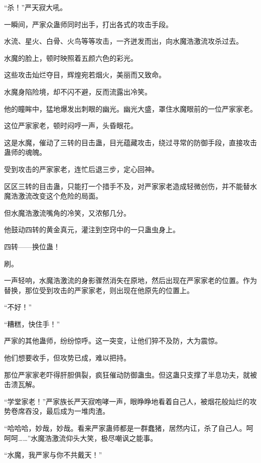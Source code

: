 
\begin{this_body}



“杀！”严天寂大吼。

一瞬间，严家众蛊师同时出手，打出各式的攻击手段。

水流、星火、白骨、火鸟等等攻击，一齐迸发而出，向水魔浩激流攻杀过去。

水魔的脸上，顿时映照着五颜六色的彩光。

这些攻击灿烂夺目，辉煌宛若烟火，美丽而又致命。

水魔身陷险境，却不闪不避，反而流露出冷笑。

他的瞳眸中，猛地爆发出刺眼的幽光。幽光大盛，罩住水魔眼前的一位严家家老。

这位严家家老，顿时闷哼一声，头昏眼花。

这是水魔，催动了三转的目击蛊，目光蕴藏攻击，绕过寻常的防御手段，直接攻击蛊师的魂魄。

受到攻击的严家家老，连忙后退三步，定心回神。

区区三转的目击蛊，只能打一个措手不及，对严家家老造成轻微创伤，并不能替水魔浩激流改变这个危险的局面。

但水魔浩激流嘴角的冷笑，又浓郁几分。

他鼓动四转的黄金真元，灌注到空窍中的一只蛊虫身上。

四转——换位蛊！

刷。

一声轻响，水魔浩激流的身影骤然消失在原地，然后出现在严家家老的位置。作为替换，那位受到攻击的严家家老，则出现在他原先的位置上。

“不好！”

“糟糕，快住手！”

严家的其他蛊师，纷纷惊呼。这一突变，让他们猝不及防，大为震惊。

他们想要收手，但攻势已成，难以把持。

那位严家家老吓得肝胆俱裂，疯狂催动防御蛊虫。但这蛊只支撑了半息功夫，就被击溃瓦解。

“学堂家老！”严家族长严天寂咆哮一声，眼睁睁地看着自己人，被烟花般灿烂的攻势卷席吞没，最后成为一堆肉渣。

“哈哈哈，妙哉，妙哉。看来严家蛊师都是一群蠢猪，居然内讧，杀了自己人。呵呵呵……”水魔浩激流仰头大笑，极尽嘲讽之能事。

“水魔，我严家与你不共戴天！”


\end{this_body}

